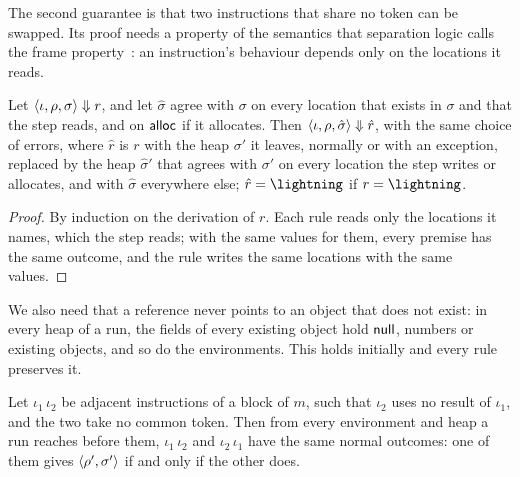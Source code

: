 The second guarantee is that two instructions that share no token can be
swapped. Its proof needs a property of the semantics that separation logic
calls the frame property~\cite{yang2002local,reynolds2002separation}: an
instruction's behaviour depends only on the locations it reads.

\begin{lemma}[Locality]\label{lem:ee-locality}
Let $\langle \iota, \rho, \sigma \rangle \Downarrow r$, and let $\hat\sigma$ agree with
$\sigma$ on every location that exists in $\sigma$ and that the step reads,
and on $\mathsf{alloc}$ if it allocates. Then $\langle \iota, \rho, \hat\sigma \rangle
\Downarrow \hat r$, with the same choice of errors, where $\hat r$ is $r$ with
the heap $\sigma'$ it leaves, normally or with an exception, replaced by the
heap $\hat\sigma'$ that agrees with $\sigma'$ on every location the step writes
or allocates, and with $\hat\sigma$ everywhere else; $\hat r = \Trap$ if
$r = \Trap$.
\end{lemma}

\begin{proof}
By induction on the derivation of $r$. Each rule reads only the locations it
names, which the step reads; with the same values for them, every premise has
the same outcome, and the rule writes the same locations with the same values.
\end{proof}

We also need that a reference never points to an object that does not exist:
in every heap of a run, the fields of every existing object hold $\mathsf{null}$, numbers
or existing objects, and so do the environments. This holds initially and every
rule preserves it.

\begin{theorem}[Independence]\label{thm:ee-independence}
Let $\iota_1\,\iota_2$ be adjacent instructions of a block of $m$, such that
$\iota_2$ uses no result of $\iota_1$, and the two take no common token. Then
from every environment and heap a run reaches before them, $\iota_1\,\iota_2$
and $\iota_2\,\iota_1$ have the same normal outcomes: one of them gives
$\langle \rho', \sigma' \rangle$ if and only if the other does.
\end{theorem}

